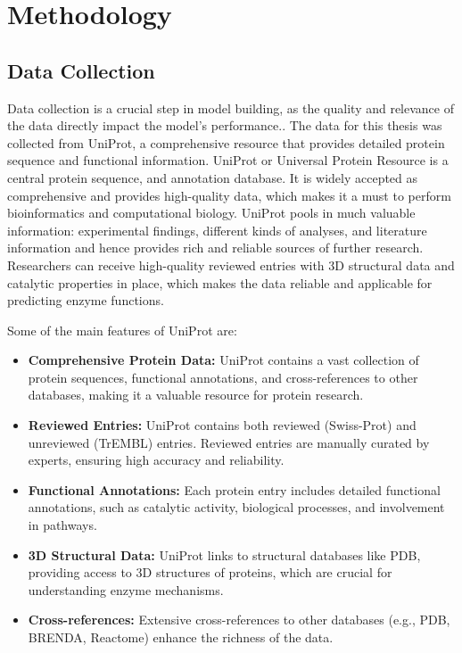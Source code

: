 \section{Methodology}

\subsection{Data Collection}
\label{sec:Data Collection}

Data collection is a crucial step in model building, as the quality and relevance of the data directly impact the model’s performance.. The data for this thesis was collected from UniProt, a comprehensive resource that provides detailed protein sequence and functional information. UniProt or Universal Protein Resource is a central protein sequence, and annotation database. It is widely accepted as comprehensive and provides high-quality data, which makes it a must to perform bioinformatics and computational biology. UniProt pools in much valuable information: experimental findings, different kinds of analyses, and literature information and hence provides rich and reliable sources of further research. Researchers can receive high-quality reviewed entries with 3D structural data and catalytic properties in place, which makes the data reliable and applicable for predicting enzyme functions. \autocite{uniprotconsortiumUniProtUniversalProtein2021}

Some of the main features of UniProt are:

\begin{itemize}
    \item \textbf{Comprehensive Protein Data:} UniProt contains a vast collection of protein sequences, functional annotations, and cross-references to other databases, making it a valuable resource for protein research.
    \item \textbf{Reviewed Entries:} UniProt contains both reviewed (Swiss-Prot) and unreviewed (TrEMBL) entries. Reviewed entries are manually curated by experts, ensuring high accuracy and reliability.
    \item \textbf{Functional Annotations:} Each protein entry includes detailed functional annotations, such as catalytic activity, biological processes, and involvement in pathways.
    \item \textbf{3D Structural Data:} UniProt links to structural databases like PDB, providing access to 3D structures of proteins, which are crucial for understanding enzyme mechanisms.
    \item \textbf{Cross-references:} Extensive cross-references to other databases (e.g., PDB, BRENDA, Reactome) enhance the richness of the data.
\end{itemize}

